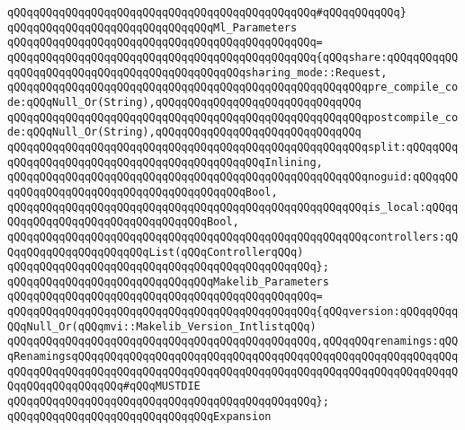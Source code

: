 \verb|qQQqqQQqqQQqqQQqqQQqqQQqqQQqqQQqqQQqqQQqqQQqqQQq#qQQqqQQqqQQq}|\newline
\newline
\verb|qQQqqQQqqQQqqQQqqQQqqQQqqQQqqQQqMl_Parameters|\newline
\verb|qQQqqQQqqQQqqQQqqQQqqQQqqQQqqQQqqQQqqQQqqQQqqQQq=|\newline
\verb|qQQqqQQqqQQqqQQqqQQqqQQqqQQqqQQqqQQqqQQqqQQqqQQq{qQQqshare:qQQqqQQqqQQqqQQqqQQqqQQqqQQqqQQqqQQqqQQqqQQqqQQqsharing_mode::Request,|\newline
\verb|qQQqqQQqqQQqqQQqqQQqqQQqqQQqqQQqqQQqqQQqqQQqqQQqqQQqqQQqpre_compile_code:qQQqNull_Or(String),qQQqqQQqqQQqqQQqqQQqqQQqqQQqqQQq|\newline
\verb|qQQqqQQqqQQqqQQqqQQqqQQqqQQqqQQqqQQqqQQqqQQqqQQqqQQqqQQqpostcompile_code:qQQqNull_Or(String),qQQqqQQqqQQqqQQqqQQqqQQqqQQqqQQq|\newline
\verb|qQQqqQQqqQQqqQQqqQQqqQQqqQQqqQQqqQQqqQQqqQQqqQQqqQQqqQQqsplit:qQQqqQQqqQQqqQQqqQQqqQQqqQQqqQQqqQQqqQQqqQQqqQQqInlining,|\newline
\verb|qQQqqQQqqQQqqQQqqQQqqQQqqQQqqQQqqQQqqQQqqQQqqQQqqQQqqQQqnoguid:qQQqqQQqqQQqqQQqqQQqqQQqqQQqqQQqqQQqqQQqqQQqBool,|\newline
\verb|qQQqqQQqqQQqqQQqqQQqqQQqqQQqqQQqqQQqqQQqqQQqqQQqqQQqqQQqis_local:qQQqqQQqqQQqqQQqqQQqqQQqqQQqqQQqqQQqBool,|\newline
\verb|qQQqqQQqqQQqqQQqqQQqqQQqqQQqqQQqqQQqqQQqqQQqqQQqqQQqqQQqcontrollers:qQQqqQQqqQQqqQQqqQQqqQQqList(qQQqControllerqQQq)|\newline
\verb|qQQqqQQqqQQqqQQqqQQqqQQqqQQqqQQqqQQqqQQqqQQqqQQq};|\newline
\newline
\verb|qQQqqQQqqQQqqQQqqQQqqQQqqQQqqQQqMakelib_Parameters|\newline
\verb|qQQqqQQqqQQqqQQqqQQqqQQqqQQqqQQqqQQqqQQqqQQqqQQq=|\newline
\verb|qQQqqQQqqQQqqQQqqQQqqQQqqQQqqQQqqQQqqQQqqQQqqQQq{qQQqversion:qQQqqQQqqQQqNull_Or(qQQqmvi::Makelib_Version_IntlistqQQq)|\newline
\verb|qQQqqQQqqQQqqQQqqQQqqQQqqQQqqQQqqQQqqQQqqQQqqQQq,qQQqqQQqrenamings:qQQqRenamingsqQQqqQQqqQQqqQQqqQQqqQQqqQQqqQQqqQQqqQQqqQQqqQQqqQQqqQQqqQQqqQQqqQQqqQQqqQQqqQQqqQQqqQQqqQQqqQQqqQQqqQQqqQQqqQQqqQQqqQQqqQQqqQQqqQQqqQQqqQQqqQQqqQQq#qQQqMUSTDIE|\newline
\verb|qQQqqQQqqQQqqQQqqQQqqQQqqQQqqQQqqQQqqQQqqQQqqQQq};|\newline
\newline
\verb|qQQqqQQqqQQqqQQqqQQqqQQqqQQqqQQqExpansion|\newline
